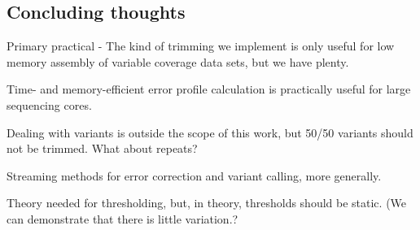 \subsection{Concluding thoughts}

Primary practical - The kind of trimming we implement is only useful
for low memory assembly of variable coverage data sets, but we have
plenty.

Time- and memory-efficient error profile calculation is practically useful
for large sequencing cores.

Dealing with variants is outside the scope of this work, but 50/50
variants should not be trimmed.  What about repeats?

Streaming methods for error correction and variant calling, more generally.

Theory needed for thresholding, but, in theory, thresholds should be
static.  (We can demonstrate that there is little variation.?


